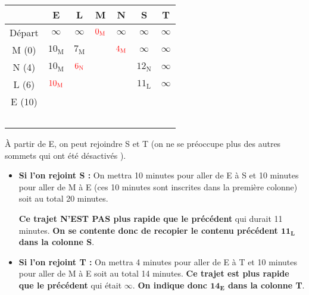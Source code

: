 \begin{center}
     \begin{extern}
          \begin{tabularx}{0.9\linewidth}{|c|C|C|C|C|C|C|}
               \hline
               \			&  E 						& L							& M							& N 							& S								& T  						\\ \hline
               Départ			&  $\infty$	 				& $\infty$					& $\color{red}0_{\text{M}}$	& $\infty$					& $\infty$						& $\infty$	  				\\ \hline
               M (0) 			&  $10_{\text{M}}$	 		& $7_{\text{M}}$	 			& 		& $\color{red}4_{\text{M}}$	& $\infty$						& $\infty$ 					\\ \hline
               N (4)			&  $10_{\text{M}}$	 		& $\color{red}6_{\text{N}}$	& \cellcolor{black!20}		& 		& $12_{\text{N}}$				& $\infty$ 					\\ \hline
               L (6)			&  $\color{red}10_{\text{M}}$	& 		& \cellcolor{black!20}		& 		& $11_{\text{L}}$				& $\infty$ 					\\ \hline
               E (10)			&  		& 		& \cellcolor{black!20}		& 		& \		& \	 		\\ \hline
               &  		& 		& 		& 		& \	& \	 		\\ \hline
          \end{tabularx}
     \end{extern}
\end{center}
\`A partir de E, on peut rejoindre S et T (on ne se préoccupe plus des autres sommets qui ont été \og désactivés \fg{}).
\begin{itemize}
     \item \textbf{Si l'on rejoint S :} On mettra 10 minutes pour aller de E à S et 10 minutes pour aller de M à E (ces 10 minutes sont inscrites dans la première colonne) soit au total 20 minutes.
     \par
     \textbf{Ce trajet N'EST PAS plus rapide que le précédent} qui durait 11 minutes. \textbf{On se contente donc de recopier le contenu précédent $\bm{11_{\text{L}}}$ dans la colonne S}.
     \item \textbf{Si l'on rejoint T :} On mettra 4 minutes pour aller de E à T et 10 minutes pour aller de M à E soit au total 14 minutes. \textbf{Ce trajet est plus rapide que le précédent} qui était $\infty$. \textbf{On indique donc $\bm{14_{\text{E}}}$ dans la colonne T}.
\end{itemize}
